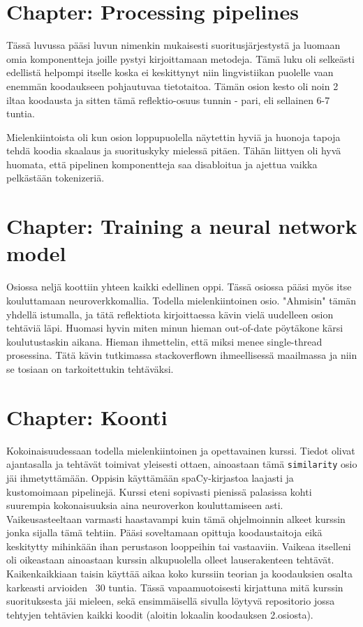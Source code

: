 \documentclass{article}
\begin{document}
\section{Chapter: Processing pipelines} 

Tässä luvussa pääsi luvun nimenkin mukaisesti suoritusjärjestystä ja luomaan omia komponentteja joille pystyi kirjoittamaan metodeja.
Tämä luku oli selkeästi edellistä helpompi itselle koska ei keskittynyt niin lingvistiikan puolelle vaan enemmän koodaukseen pohjautuvaa tietotaitoa. Tämän osion kesto oli noin 2 iltaa koodausta ja sitten tämä reflektio-osuus tunnin - pari, eli sellainen 6-7 tuntia.

Mielenkiintoista oli kun osion loppupuolella näytettin hyviä ja huonoja tapoja tehdä koodia skaalaus ja suorituskyky mielessä pitäen. Tähän liittyen oli hyvä huomata, että pipelinen komponentteja saa disabloitua ja ajettua vaikka pelkästään tokenizeriä.


\section{Chapter: Training a neural network model}

Osiossa neljä koottiin yhteen kaikki edellinen oppi.
Tässä osiossa pääsi myös itse kouluttamaan neuroverkkomallia.
Todella mielenkiintoinen osio. "Ahmisin" tämän yhdellä istumalla, ja tätä reflektiota kirjoittaessa kävin vielä uudelleen osion tehtäviä läpi. Huomasi hyvin miten minun hieman out-of-date pöytäkone kärsi koulutustaskin aikana. Hieman ihmettelin, että miksi menee single-thread prosessina.
Tätä kävin tutkimassa stackoverflown ihmeellisessä maailmassa ja niin se tosiaan on tarkoitettukin tehtäväksi.


\section{Chapter: Koonti}

Kokoinaisuudessaan todella mielenkiintoinen ja opettavainen kurssi. Tiedot olivat ajantasalla ja tehtävät toimivat yleisesti ottaen, ainoastaan tämä \verb|similarity| osio jäi ihmetyttämään. Oppisin käyttämään spaCy-kirjastoa laajasti ja kustomoimaan pipelinejä. Kurssi eteni sopivasti pienissä palasissa kohti suurempia kokonaisuuksia aina neuroverkon kouluttamiseen asti. Vaikeusasteeltaan varmasti haastavampi kuin tämä ohjelmoinnin alkeet kurssin jonka sijalla tämä tehtiin. Pääsi soveltamaan opittuja koodaustaitoja eikä keskitytty mihinkään ihan perustason looppeihin tai vastaaviin. Vaikeaa itselleni oli oikeastaan ainoastaan kurssin alkupuolella olleet lauserakenteen tehtävät. Kaikenkaikkiaan taisin käyttää aikaa koko kurssiin teorian ja koodauksien osalta karkeasti arvioiden ~30 tuntia. Tässä vapaamuotoisesti kirjattuna mitä kurssin suorituksesta jäi mieleen, sekä ensimmäisellä sivulla löytyvä repositorio jossa tehtyjen tehtävien kaikki koodit (aloitin lokaalin koodauksen 2.osiosta).
\end{document}
